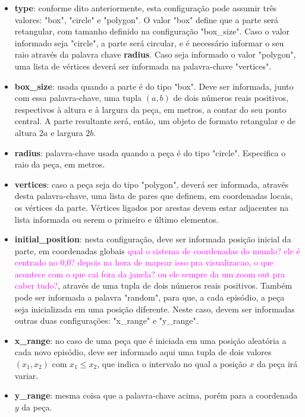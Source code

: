 \documentclass[cic,tc]{iiufrgs}
\newcommand\bruno[1]{\textcolor{magenta}{#1}}
\begin{document}
     \begin{itemize}
       \item \textbf{type}: conforme dito anteriormente, esta configuração pode assumir três valores: "box", "circle" e "polygon". O valor "box" define que
       a parte será retangular, com tamanho definido na configuração "box\_size". Caso o valor informado seja "circle", a parte será circular, e é necessário
       informar o seu raio através da palavra chave \textbf{radius}. Caso seja informado o valor "polygon", uma lista de vértices deverá ser informada na palavra-chave
       "vertices".
       \item \textbf{box\_size}: usada quando a parte é do tipo "box". Deve ser informada, junto com essa palavra-chave, uma tupla $(a, b)$ de dois números reais positivos,
       respectivos à altura e à largura da peça, em metros, a contar do seu ponto central. A parte resultante será, então, um objeto de formato retangular e de altura $2a$ e largura $2b$.
       \item \textbf{radius}: palavra-chave usada quando a peça é do tipo "circle". Especifica o raio da peça, em metros.
       \item \textbf{vertices}: caso a peça seja do tipo "polygon", deverá ser informada, através desta palavra-chave, uma lista de pares que definem, em coordenadas locais, os vértices da parte.
       Vértices ligados por arestas devem estar adjacentes na lista informada ou serem o primeiro e último elementos.
       \item \textbf{initial\_position}: nesta configuração, deve ser informada posição inicial da parte, em coordenadas globais \bruno{qual o sistema de coordenadas do mundo? ele é centrado no 0,0? depois na hora de mapear isso pra visualizacao, o que acontece com o que cai fora da janela? ou ele sempre da um zoom out pra caber tudo?}, através de uma tupla de dois números reais positivos. Também pode ser
       informada a palavra "random", para que, a cada episódio, a peça seja inicializada em uma posição diferente. Neste caso, devem ser informadas outras duas configurações: "x\_range" e "y\_range".
       \item \textbf{x\_range}: no caso de uma peça que é iniciada em uma posição aleatória a cada novo episódio, deve ser informado aqui uma tupla de dois valores $(x_1, x_2)$ com $x_1 \leq x_2$, que indica
       o intervalo no qual a posição $x$ da peça irá variar.
       \item \textbf{y\_range}: mesma coisa que a palavra-chave acima, porém para a coordenada $y$ da peça.

\end{itemize}
\end{document}
